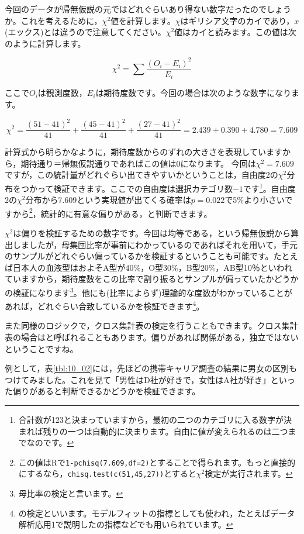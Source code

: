 \documentclass{ltjsbook}
\begin{document}
今回のデータが帰無仮説の元ではどれぐらいあり得ない数字だったのでしょうか。これを考えるために，$\chi^2$値を計算します。$\chi$はギリシア文字のカイであり，$x$(エックス)とは違うので注意してください。$\chi^2$値はカイと読みます。この値は次のように計算します。

\[ \chi^2 = \sum \frac{(O_i - E_i)^2}{E_i} \]

ここで$O_i$は観測度数，$E_i$は期待度数です。今回の場合は次のような数字になります。

\[ \chi^2 = \frac{(51-41)^2}{41} + \frac{(45-41)^2}{41} + \frac{(27-41)^2}{41} = 2.439+0.390+4.780=7.609 \]

計算式から明らかなように，期待度数からのずれの大きさを表現していますから，期待通り＝帰無仮説通りであればこの値は0になります。
今回は$\chi^2=7.609$ですが，この統計量がどれぐらい出てきやすいかということは，自由度2の$\chi^2$分布をつかって検証できます。ここでの自由度は選択カテゴリ数$-1$です\footnote{合計数が123と決まっていますから，最初の二つのカテゴリに入る数字が決まれば残りの一つは自動的に決まります。自由に値が変えられるのは二つまでなのです。}。自由度2の$\chi^2$分布から7.609という実現値が出てくる確率は$p=0.022$で5\%より小さいですから\footnote{この値はRで\verb|1-pchisq(7.609,df=2)|とすることで得られます。もっと直接的にするなら，\verb|chisq.test(c(51,45,27))|とすると$\chi^2$検定が実行されます。}，統計的に有意な偏りがある，と判断できます。

$\chi^2$は偏りを検証するための数字です。今回は均等である，という帰無仮説から算出しましたが，母集団比率が事前にわかっているのであればそれを用いて，手元のサンプルがどれぐらい偏っているかを検証するということも可能です。たとえば日本人の血液型はおよそA型が40\%，O型30\%，B型20\%，AB型10％といわれていますから，期待度数をこの比率で割り振るとサンプルが偏っていたかどうかの検証になります\footnote{母比率の検定と言います。}。他にも(比率によらず)理論的な度数がわかっていることがあれば，どれぐらい合致しているかを検証できます\footnote{の検定といいます。モデルフィットの指標としても使われ，たとえばデータ解析応用1で説明したの指標などでも用いられています。}。

また同様のロジックで，クロス集計表の検定を行うこともできます。クロス集計表の場合はと呼ばれることもあります。偏りがあれば関係がある，独立ではないということですね。

例として，表\ref{tbl:10_02}には，先ほどの携帯キャリア調査の結果に男女の区別もつけてみました。これを見て「男性はD社が好きで，女性はA社が好き」といった偏りがあると判断できるかどうかを検証できます。
\end{document}
